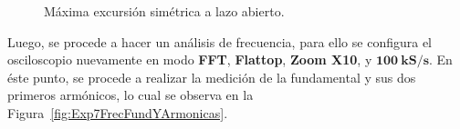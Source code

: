       \begin{figure}[H]
        \centering
          \caption{Máxima excursión simétrica a lazo abierto.}
          \label{fig:Exp7MESLazoAbierto}
      \end{figure}

      Luego, se procede a hacer un análisis de frecuencia, para ello se configura el osciloscopio nuevamente 
      en modo \textbf{FFT}, \textbf{Flattop}, \textbf{Zoom X10}, y $\mathbf{100~kS/s}$. En éste punto, se procede 
      a realizar la medición de la fundamental y sus dos primeros armónicos, lo cual se observa en la 
      Figura~\ref{fig:Exp7FrecFundYArmonicas}.

